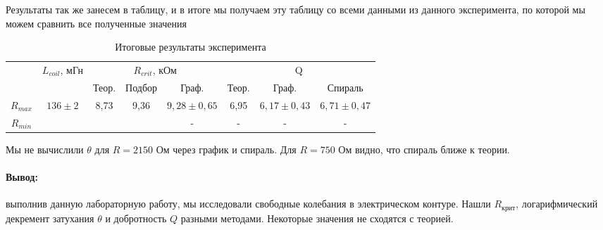 \documentclass[a4paper,12pt]{article}
\begin{document}
Результаты так же занесем в таблицу, и в итоге мы получаем эту таблицу со всеми данными из данного эксперимента, по которой мы можем сравнить все полученные значения
\begin{table}[h!]
\begin{center}
\begin{tabular}{|c|c|c|c|c|c|c|c|}
\hline
\multirow{2}{*}{} & \multirow{2}{*}{$L_{coil}$, мГн} & \multicolumn{3}{c|}{$R_{crit}$, кОм}                         & \multicolumn{3}{c|}{Q}                 \\ \cline{3-8} 
                  &                                  & Теор.                 & Подбор              & Граф.          & Теор. & Граф.         & Спираль        \\ \hline
$R_{max}$         & \multirow{2}{*}{$136 \pm 2$}   & \multirow{2}{*}{8,73} & \multirow{2}{*}{9,36} & $9,28 \pm 0,65$ & 6,95   & $6,17 \pm 0,43$ & $6,71 \pm 0,47$  \\ \cline{1-1} \cline{5-8} 
$R_{min}$         &                                  &                       &                     & -    & - & - & - \\ \hline
\end{tabular}
\caption{Итоговые результаты эксперимента}
\end{center}
\end{table}
Мы не вычислили $\theta$ для $R=2150$ Ом через график и спираль. Для $R=750$ Ом видно, что спираль ближе к теории.
\paragraph{Вывод:} выполнив данную лабораторную работу, мы исследовали свободные колебания в электрическом контуре. Нашли $R_{крит}$, логарифмический декремент затухания $\theta$ и добротность $Q$ разными методами. Некоторые значения не сходятся с теорией.
\end{document}
